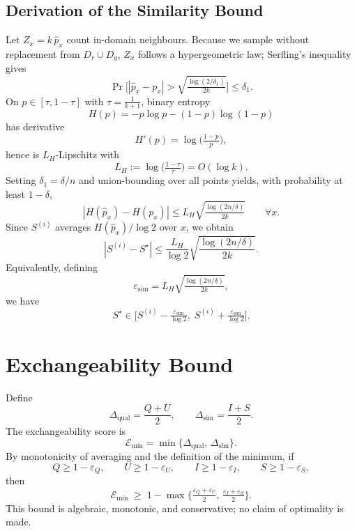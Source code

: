 \subsection{Derivation of the Similarity Bound}
\label{app:similarity-bound}

Let $Z_x=k\,\hat p_x$ count in-domain neighbours. Because we sample without replacement from $D_r\cup D_g$, $Z_x$ follows a hypergeometric law; Serfling's inequality~\citep{serfling1974} gives
\begin{equation}
\Pr\Big[|\hat p_x-p_x|>\sqrt{\tfrac{\log(2/\delta_1)}{2k}}\Big]\le \delta_1.
\tag{B.2}
\end{equation}
On $p\in[\tau,1-\tau]$ with $\tau=\tfrac1{k+1}$, binary entropy
\[
H(p)=-p\log p-(1-p)\log(1-p)
\]
has derivative
\[
H'(p)=\log\!\bigl(\tfrac{1-p}{p}\bigr),
\]
hence is $L_H$-Lipschitz with
\[
L_H:=\log\!\bigl(\tfrac{1-\tau}{\tau}\bigr)=O(\log k).
\]
Setting $\delta_1=\delta/n$ and union-bounding over all points yields, with probability at least $1-\delta$,
\begin{equation}
|H(\hat p_x)-H(p_x)| \le L_H\sqrt{\tfrac{\log(2n/\delta)}{2k}}
\qquad \forall x.
\tag{B.3}
\end{equation}
Since $S^{(i)}$ averages $H(\hat p_x)/\log 2$ over $x$, we obtain
\[
|S^{(i)} - S^\star|
\le \frac{L_H}{\log 2}\sqrt{\frac{\log(2n/\delta)}{2k}}.
\]
Equivalently, defining
\[
\varepsilon_{\mathrm{sim}}=L_H\sqrt{\tfrac{\log(2n/\delta)}{2k}},
\]
we have
\[
S^\star \in \Big[S^{(i)}-\tfrac{\varepsilon_{\mathrm{sim}}}{\log 2},\;
S^{(i)}+\tfrac{\varepsilon_{\mathrm{sim}}}{\log 2}\Big].
\]

\section{Exchangeability Bound}
\label{app:theory-exchangeability}
\label{appendix:exchangeability_metric}

Define
\[
\Delta_{\text{qual}}=\frac{Q+U}{2},
\qquad
\Delta_{\text{sim}}=\frac{I+S}{2}.
\]
The exchangeability score is
\begin{equation}
\mathcal E_{\min}=\min\{\Delta_{\text{qual}},\,\Delta_{\text{sim}}\}.
\tag{12}
\end{equation}
By monotonicity of averaging and the definition of the minimum, if
\[
Q\ge 1-\varepsilon_Q,\qquad
U\ge 1-\varepsilon_U,\qquad
I\ge 1-\varepsilon_I,\qquad
S\ge 1-\varepsilon_S,
\]
then
\begin{equation}
\mathcal E_{\min}\;\ge\;
1-\max\Big\{\tfrac{\varepsilon_Q+\varepsilon_U}{2},\,
\tfrac{\varepsilon_I+\varepsilon_S}{2}\Big\}.
\tag{13}
\end{equation}
This bound is algebraic, monotonic, and conservative; no claim of optimality is made.

